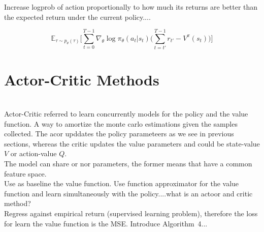 \noindent Increase logprob of action proportionally to how much its returns are better 
than the expected return under the current policy....

\begin{equation}
    \mathbb{E}_{\tau\sim p_{\theta}(\tau)} \bigg[\sum_{t=0}^{T-1}\nabla_{\theta}\log\pi_{\theta}(a_{t}|s_{t}) \bigg( \sum_{t=t'}^{T-1} r_{t'}-V^{\pi}(s_{t}) \bigg) \bigg]
\end{equation}

\section{Actor-Critic Methods}

 \\

Actor-Critic referred to learn concurrently models for the policy and the value function. A way to amortize the monte carlo estimations given the samples collected. The acor upddates the policy parameteers as we see in previous sections, whereas the critic updates the value parameters and could be state-value $V$ or action-value $Q$. \\

\noindent The model can share or nor parameters, the former means that have a common feature space. \\

\noindent Use as baseline the value function. Use function approximator for the value function and learn simultaneously with the policy....what is an actoor and critic method? \\ 

\noindent Regress against empirical return (supervised learning problem), therefore the loss for learn the value function is the MSE. Introduce Algorithm~4... \\


